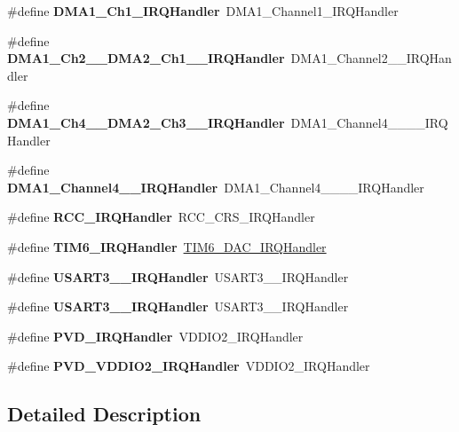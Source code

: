 \begin{DoxyCompactItemize}
\#define {\bfseries D\+M\+A1\+\_\+\+Ch1\+\_\+\+I\+R\+Q\+Handler}~D\+M\+A1\+\_\+\+Channel1\+\_\+\+I\+R\+Q\+Handler
\item 
\mbox{\label{group__stm32f078xx_ga3752ab0b9a6635ccd7bc87b99ee8fd9b}} 
\#define {\bfseries D\+M\+A1\+\_\+\+Ch2\+\_\+\_\+\+D\+M\+A2\+\_\+\+Ch1\+\_\+\_\+\+I\+R\+Q\+Handler}~D\+M\+A1\+\_\+\+Channel2\+\_\+\_\+\+I\+R\+Q\+Handler
\item 
\mbox{\label{group__stm32f078xx_ga035f9aa47c046222541cca70e281b415}} 
\#define {\bfseries D\+M\+A1\+\_\+\+Ch4\+\_\+\_\+\+D\+M\+A2\+\_\+\+Ch3\+\_\+\_\+\+I\+R\+Q\+Handler}~D\+M\+A1\+\_\+\+Channel4\+\_\+\_\+\_\+\_\+\+I\+R\+Q\+Handler
\item 
\mbox{\label{group__stm32f078xx_gac0e40c40e17f156c06448e594bf54eaf}} 
\#define {\bfseries D\+M\+A1\+\_\+\+Channel4\+\_\+\_\+\+I\+R\+Q\+Handler}~D\+M\+A1\+\_\+\+Channel4\+\_\+\_\+\_\+\_\+\+I\+R\+Q\+Handler
\item 
\mbox{\label{group__stm32f078xx_ga5a6d083fa78461da86a717b28973e009}} 
\#define {\bfseries R\+C\+C\+\_\+\+I\+R\+Q\+Handler}~R\+C\+C\+\_\+\+C\+R\+S\+\_\+\+I\+R\+Q\+Handler
\item 
\mbox{\label{group__stm32f078xx_gae30e35a563a952a284f3f54d7f164ccd}} 
\#define {\bfseries T\+I\+M6\+\_\+\+I\+R\+Q\+Handler}~\hyperlink{group___h_a_l___time_base___t_i_m_ga0839a45f331c4c067939b9c4533bbf4d}{T\+I\+M6\+\_\+\+D\+A\+C\+\_\+\+I\+R\+Q\+Handler}
\item 
\mbox{\label{group__stm32f078xx_gaf04189172ff710986cd652a06e6f3f69}} 
\#define {\bfseries U\+S\+A\+R\+T3\+\_\+\_\+\+I\+R\+Q\+Handler}~U\+S\+A\+R\+T3\+\_\+\_\+\+I\+R\+Q\+Handler
\item 
\mbox{\label{group__stm32f078xx_ga36a6fa2533fdea503ca6341545d3148e}} 
\#define {\bfseries U\+S\+A\+R\+T3\+\_\+\_\+\+I\+R\+Q\+Handler}~U\+S\+A\+R\+T3\+\_\+\_\+\+I\+R\+Q\+Handler
\item 
\mbox{\label{group__stm32f078xx_ga045476dfaec8c84f5e16b06b937c0c18}} 
\#define {\bfseries P\+V\+D\+\_\+\+I\+R\+Q\+Handler}~V\+D\+D\+I\+O2\+\_\+\+I\+R\+Q\+Handler
\item 
\mbox{\label{group__stm32f078xx_ga9a2577324b65f147fff0fc4f38dcf5e2}} 
\#define {\bfseries P\+V\+D\+\_\+\+V\+D\+D\+I\+O2\+\_\+\+I\+R\+Q\+Handler}~V\+D\+D\+I\+O2\+\_\+\+I\+R\+Q\+Handler
\end{DoxyCompactItemize}


\subsection{Detailed Description}
